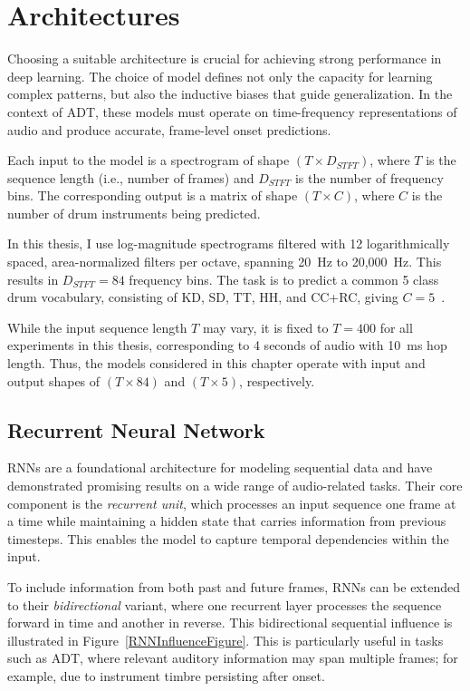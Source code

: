 \chapter{Architectures}\label{Architectures}

Choosing a suitable architecture is crucial for achieving strong performance in deep learning. The choice of model defines not only the capacity for learning complex patterns, but also the inductive biases that guide generalization. In the context of \gls{ADT}, these models must operate on time-frequency representations of audio and produce accurate, frame-level onset predictions.

Each input to the model is a spectrogram of shape $(T \times D_{STFT})$, where $T$ is the sequence length (i.e., number of frames) and $D_{STFT}$ is the number of frequency bins. The corresponding output is a matrix of shape $(T \times C)$, where $C$ is the number of drum instruments being predicted.

In this thesis, I use log-magnitude spectrograms filtered with 12 logarithmically spaced, area-normalized filters per octave, spanning 20~Hz to 20,000~Hz. This results in $D_{STFT} = 84$ frequency bins. The task is to predict a common 5 class drum vocabulary, consisting of \acrfull{KD}, \acrfull{SD}, \acrfull{TT}, \acrfull{HH}, and \acrfull{CC+RC}, giving $C = 5$~\cite{zehren2024analyzingreducingsynthetictorealtransfer}.

While the input sequence length $T$ may vary, it is fixed to $T = 400$ for all experiments in this thesis, corresponding to 4 seconds of audio with 10~ms hop length. Thus, the models considered in this chapter operate with input and output shapes of $(T \times 84)$ and $(T \times 5)$, respectively.

\section{Recurrent Neural Network}

\glspl{RNN} are a foundational architecture for modeling sequential data and have demonstrated promising results on a wide range of audio-related tasks. Their core component is the \textit{recurrent unit}, which processes an input sequence one frame at a time while maintaining a hidden state that carries information from previous timesteps. This enables the model to capture temporal dependencies within the input.

To include information from both past and future frames, \glspl{RNN} can be extended to their \textit{bidirectional} variant, where one recurrent layer processes the sequence forward in time and another in reverse. This bidirectional sequential influence is illustrated in Figure~\ref{RNNInfluenceFigure}. This is particularly useful in tasks such as \gls{ADT}, where relevant auditory information may span multiple frames; for example, due to instrument timbre persisting after onset.


